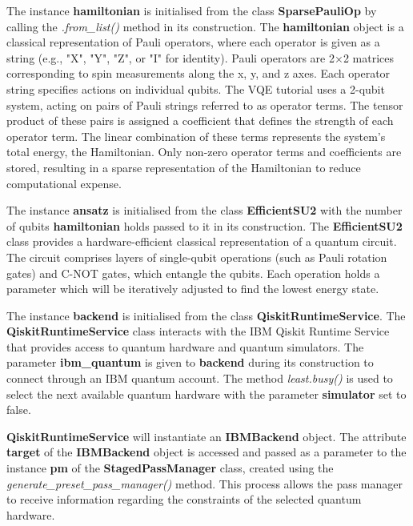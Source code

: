 \documentclass{article}
\begin{document}
{The instance \textbf{hamiltonian} is initialised from the class \textbf{SparsePauliOp} by calling the \textit{.from\_list()} method in its construction. The \textbf{hamiltonian} object is a classical representation of Pauli operators, where each operator is given as a string (e.g., "X", "Y", "Z", or "I" for identity). Pauli operators are 2×2 matrices corresponding to spin measurements along the x, y, and z axes\cite{DJORDJEVIC201229}. Each operator string specifies actions on individual qubits. The VQE tutorial uses a 2-qubit system, acting on pairs of Pauli strings referred to as operator terms. The tensor product of these pairs is assigned a coefficient that defines the strength of each operator term. The linear combination of these terms represents the system's total energy, the Hamiltonian. Only non-zero operator terms and coefficients are stored, resulting in a sparse representation of the Hamiltonian to reduce computational expense\cite{EITCA2024}\cite{SparsePauliOp}\cite{PauliList}.

The instance \textbf{ansatz} is initialised from the class \textbf{EfficientSU2} with the number of qubits \textbf{hamiltonian} holds passed to it in its construction. The \textbf{EfficientSU2} class provides a hardware-efficient classical representation of a quantum circuit\cite{EfficientSU2}. The circuit comprises layers of single-qubit operations (such as Pauli rotation gates) and C-NOT gates, which entangle the qubits\cite{EfficientSU2}. Each operation holds a parameter which will be iteratively adjusted to find the lowest energy state.

The instance \textbf{backend} is initialised from the class \textbf{QiskitRuntimeService}. The \textbf{QiskitRuntimeService} class interacts with the IBM Qiskit Runtime Service that provides access to quantum hardware and quantum simulators. The parameter \textbf{ibm\_quantum} is given to \textbf{backend} during its construction to connect through an IBM quantum account\cite{qrsreadme}. The method \textit{least.busy()} is used to select the next available quantum hardware with the parameter \textbf{simulator} set to false.

\textbf{QiskitRuntimeService} will instantiate an \textbf{IBMBackend} object. The attribute \textbf{target} of the \textbf{IBMBackend} object is accessed and passed as a parameter to the instance \textbf{pm} of the \textbf{StagedPassManager} class, created using the \textit{generate\_preset\_pass\_manager()} method. This process allows the pass manager to receive information regarding the constraints of the selected quantum hardware.

}
\end{document}
